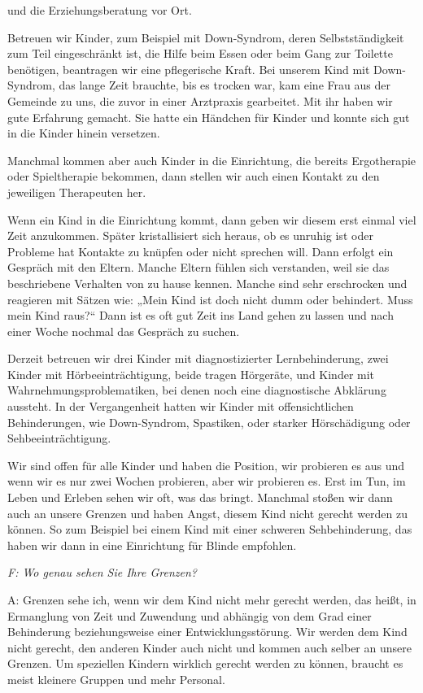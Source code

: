 \begin{linenumbers*}
und die Erziehungsberatung vor Ort. 

Betreuen wir Kinder, zum Beispiel mit Down-Syndrom, deren Selbstständigkeit zum Teil eingeschränkt ist, die Hilfe beim Essen oder beim Gang zur Toilette benötigen, beantragen wir eine pflegerische Kraft. Bei unserem Kind mit Down-Syndrom, das lange Zeit brauchte, bis es trocken war, kam eine Frau aus der Gemeinde zu uns, die zuvor in einer Arztpraxis gearbeitet. Mit ihr haben wir gute Erfahrung gemacht. Sie hatte ein Händchen für Kinder und konnte sich gut in die Kinder hinein versetzen. 

Manchmal kommen aber auch Kinder in die Einrichtung, die bereits Ergotherapie oder Spieltherapie bekommen, dann stellen wir auch einen Kontakt zu den jeweiligen Therapeuten her. 

Wenn ein Kind in die Einrichtung kommt, dann geben wir diesem erst einmal viel Zeit anzukommen. Später kristallisiert sich heraus, ob es unruhig ist oder Probleme hat Kontakte zu knüpfen oder nicht sprechen will. Dann erfolgt ein Gespräch mit den Eltern. Manche Eltern fühlen sich verstanden, weil sie das beschriebene Verhalten von zu hause kennen. Manche sind sehr erschrocken und reagieren mit Sätzen wie: „Mein Kind ist doch nicht dumm oder behindert. Muss mein Kind raus?“ Dann ist es oft gut Zeit ins Land gehen zu lassen und nach einer Woche nochmal das Gespräch zu suchen. 

Derzeit betreuen wir drei Kinder mit diagnostizierter Lernbehinderung, zwei Kinder mit Hörbeeinträchtigung, beide tragen Hörgeräte, und Kinder mit Wahrnehmungsproblematiken, bei denen noch eine diagnostische Abklärung aussteht. In der Vergangenheit hatten wir Kinder mit offensichtlichen Behinderungen, wie Down-Syndrom, Spastiken, oder starker Hörschädigung oder Sehbeeinträchtigung. 

Wir sind offen für alle Kinder und haben die Position, wir probieren es aus und wenn wir es nur zwei Wochen probieren, aber wir probieren es. Erst im Tun, im Leben und Erleben sehen wir oft, was das bringt. Manchmal stoßen wir dann auch an unsere Grenzen und haben Angst, diesem Kind nicht gerecht werden zu können. So zum Beispiel bei einem Kind mit einer schweren Sehbehinderung, das haben wir dann in eine Einrichtung für Blinde empfohlen. 

\emph{F: Wo genau sehen Sie Ihre Grenzen?}

A: Grenzen sehe ich, wenn wir dem Kind nicht mehr gerecht werden, das heißt, in Ermanglung von Zeit und Zuwendung und abhängig von dem Grad einer Behinderung beziehungsweise einer Entwicklungsstörung. Wir werden dem Kind nicht gerecht, den anderen Kinder auch nicht und kommen auch selber an unsere Grenzen. Um speziellen Kindern wirklich gerecht werden zu können, braucht es meist kleinere Gruppen und mehr Personal. 


\end{linenumbers*}
